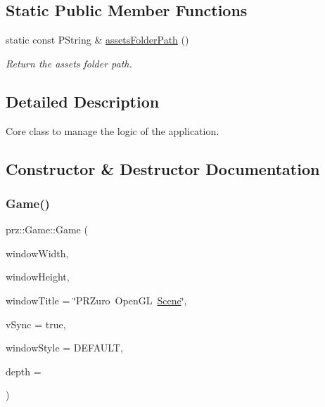 \subsection*{Static Public Member Functions}
\begin{DoxyCompactItemize}
\item 
static const P\+String \& \mbox{\hyperlink{classprz_1_1_game_aff14ff5fb4ab33c68b769b4262139879}{assets\+Folder\+Path}} ()
\begin{DoxyCompactList}\small\item\em Return the assets folder path. \end{DoxyCompactList}\end{DoxyCompactItemize}


\subsection{Detailed Description}
Core class to manage the logic of the application. 



\subsection{Constructor \& Destructor Documentation}
\mbox{\label{classprz_1_1_game_a7d4e2a604dc46ca59fe9ab1911148a08}} 
\subsubsection{\texorpdfstring{Game()}{Game()}}
{\footnotesize\ttfamily prz\+::\+Game\+::\+Game (\begin{DoxyParamCaption}\item[{unsigned int}]{window\+Width,  }\item[{unsigned int}]{window\+Height,  }\item[{const P\+String \&}]{window\+Title = {\ttfamily \char`\"{}PRZuro~OpenGL~\mbox{\hyperlink{classprz_1_1_scene}{Scene}}\char`\"{}},  }\item[{bool}]{v\+Sync = {\ttfamily true},  }\item[{const Window\+Style \&}]{window\+Style = {\ttfamily DEFAULT},  }\item[{unsigned int}]{depth = {} }\end{DoxyParamCaption})}



